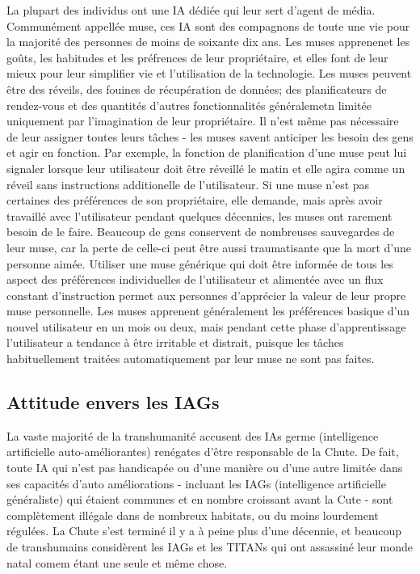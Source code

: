 La plupart des individus ont une IA dédiée qui leur sert d'agent de média. Communément appellée muse, ces IA sont des compagnons de toute une vie pour la majorité des personnes de moins de soixante dix ans. Les muses apprenenet les goûts, les habitudes et les préfrences de leur propriétaire, et elles font de leur mieux pour leur simplifier vie et l'utilisation de la technologie. Les muses peuvent être des réveils, des fouines de récupération de données; des planificateurs de rendez-vous et des quantités d'autres fonctionnalités généralemetn limitée uniquement par l'imagination de leur propriétaire. Il n'est même pas nécessaire de leur assigner toutes leurs tâches - les muses savent anticiper les besoin des gens et agir en fonction. Par exemple, la fonction de planification d'une muse peut lui signaler lorsque leur utilisateur doit être réveillé le matin et elle agira comme un réveil sans instructions additionelle de l'utilisateur. Si une muse n'est pas certaines des préférences de son propriétaire, elle demande, mais après avoir travaillé avec l'utilisateur pendant quelques décennies, les muses ont rarement besoin de le faire. Beaucoup de gens conservent de nombreuses sauvegardes de leur muse, car la perte de celle-ci peut être aussi traumatisante que la mort d'une personne aimée. Utiliser une muse générique qui doit être informée de tous les aspect des préférences individuelles de l'utilisateur et alimentée avec un flux constant d'instruction permet aux personnes d'apprécier la valeur de leur propre muse personnelle. Les muses apprenent généralement les préférences basique d'un nouvel utilisateur en un mois ou deux, mais pendant cette phase d'apprentissage l'utilisateur a tendance à être irritable et distrait, puisque les tâches habituellement traitées automatiquement par leur muse ne sont pas faites. 

\subsection{Attitude envers les IAGs} \label{sec:attit-toward-agis} 

La vaste majorité de la transhumanité accusent des IAs germe (intelligence artificielle auto-améliorantes) renégates d'être responsable de la Chute. De fait, toute IA qui n'est pas handicapée ou d'une manière ou d'une autre limitée dans ses capacités d'auto améliorations - incluant les IAGs (intelligence artificielle généraliste) qui étaient communes et en nombre croissant avant la Cute - sont complètement illégale dans de nombreux habitats, ou du moins lourdement régulées. La Chute s'est terminé il y a à peine plus d'une décennie, et beaucoup de transhumains considèrent les IAGs et les TITANs qui ont assassiné leur monde natal comem étant une seule et même chose. 

